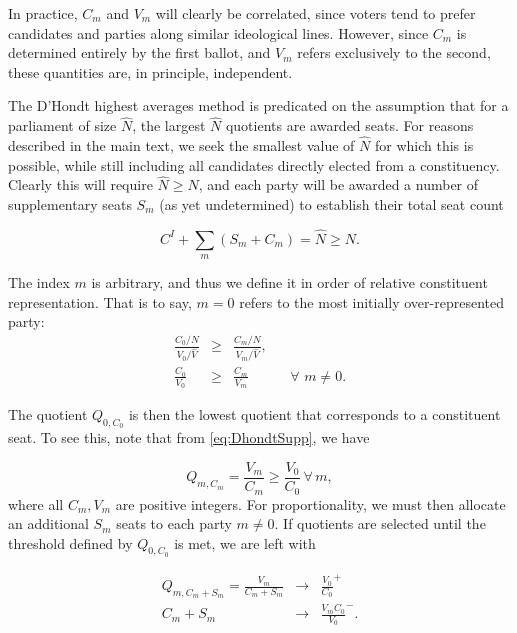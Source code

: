 In practice, $C_m$ and $V_m$ will clearly be correlated, since voters tend to prefer candidates and parties along similar ideological lines. However, since $C_m$ is determined entirely by the first ballot, and $V_m$ refers exclusively to the second, these quantities are, in principle, independent.

The D'Hondt highest averages method is predicated on the assumption that for a parliament of size $\hat{N}$, the largest $\hat{N}$ quotients are awarded seats. 
For reasons described in the main text, we seek the smallest value of $\hat{N}$ for which this is possible, while still including all candidates directly elected from a constituency.
Clearly this will require $\hat{N}\ge N$, and each party will be awarded a number of supplementary seats $S_m$ (as yet undetermined) to establish their total seat count 

\begin{equation}
\label{eq:sum_Sm}
C^I + \sum_m\left( S_m +C_m\right) = \hat{N} \ge N.
\end{equation}

The index $m$ is arbitrary, and thus we define it in order of relative constituent representation. That is to say, $m=0$ refers to the most initially over-represented party:
\begin{align}
\label{eq:most_overrep}
\frac{C_0/N}{V_0/\hat{V}} &\ge& \frac{C_m/N}{V_m/\hat{V}}, \\
\frac{C_0}{V_0} &\ge& \frac{C_m}{V_m} && \forall \,\, m \neq 0.
\end{align}

The quotient $Q_{0,C_0}$ is then the lowest quotient that corresponds to a constituent seat. To see this, note that from \ref{eq:DhondtSupp}, we have 

\begin{equation}
\label{eq:QmCm}
Q_{m,C_m} = \frac{V_m}{C_m} \ge \frac{V_0}{C_0} \,  \forall \, m,
\end{equation}
where all $C_m,V_m$ are positive integers. For proportionality, we must then allocate an additional $S_m$ seats to each party $m \neq 0$. If quotients are selected until the  threshold defined by $Q_{0,C_0}$ is met, we are left with

\begin{align}
\label{eq:QmSm}
Q_{m,C_m+S_m} = \frac{V_m}{C_m+S_m} &\to& \frac{V_0}{C_0}^+ \\ 
{C_m+S_m} &\to& \frac{V_mC_0}{V_0}^-.
\end{align}

